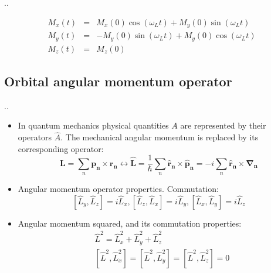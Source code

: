 \documentclass{beamer}
\begin{document}
\begin{frame}{\thesection.\thesubsection. \insertsubsection}
\begin{itemize}[<+>]
			\begin{equation} 
			\begin{array}{lcl}
			M_x(t) &=& M_x(0) \cos(\omega_L t) + M_y(0) \sin (\omega_L t) \\
			M_y(t) &=& -M_y(0) \sin(\omega_L t) + M_y(0) \cos (\omega_L t) \\
			M_z(t) &=& M_z(0) 
			\end{array}
			\end{equation}
		
		
	\end{itemize}
		
\end{frame}

\subsection{Orbital angular momentum operator}
\begin{frame}{\thesection.\thesubsection. \insertsubsection}
	
	\begin{itemize}[<+>]
		\item     In quantum mechanics physical quantities $A$ are represented by their operators $\hat{A}$. The mechanical angular momentum is replaced by its corresponding operator:
		\begin{equation}
		\bm{L} = \sum_{n} \bm{p_n} \times \bm{r_n}  \longleftrightarrow \bm{\hat{L}} = \dfrac{1}{\hbar} \sum_{n} \bm{\hat{r}_n} \times \bm{\hat{p}_n} =   -i \sum_{n} \bm{\hat{r}_n} \times \bm{\nabla_n}
		\end{equation}
		\item Angular momentum operator properties. Commutation:
		\begin{equation}\label{eq:Lz_commutation}
		  [\hat{L}_y,\hat{L}_z] = i\hat{L}_x, [\hat{L}_z,\hat{L}_x] = i\hat{L}_y, [\hat{L}_x,\hat{L}_y] = i\hat{L}_z
    	\end{equation}
		\item Angular momentum squared, and its commutation properties:
        \begin{align}
          &\hat{L}^2 = \hat{L}_x^2 + \hat{L}_y^2 + \hat{L}_z^2 \\
          &[\hat{L}^2, \hat{L}_x^2]=[\hat{L}^2, \hat{L}_y^2]=[\hat{L}^2, \hat{L}_z^2]= 0       
        \end{align}        
	\end{itemize}

\end{frame}
\end{document}
